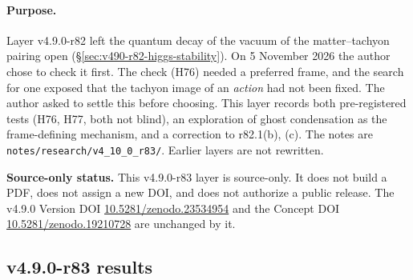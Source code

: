 \paragraph{Purpose.}
Layer v4.9.0-r82 left the quantum decay of the vacuum of the matter--tachyon pairing open
(\S\ref{sec:v490-r82-higgs-stability}).  On 5 November 2026 the author chose to check it first.  The check (H76) needed a preferred
frame, and the search for one exposed that the tachyon image of an \emph{action} had not been fixed.  The author asked to settle this
before choosing.  This layer records both pre-registered tests (H76, H77, both not blind), an exploration of ghost condensation as the
frame-defining mechanism, and a correction to r82.1(b), (c).  The notes are \texttt{notes/\allowbreak research/\allowbreak v4\_10\_0\_r83/}.
Earlier layers are not rewritten.

\noindent\textbf{Source-only status.}
This v4.9.0-r83 layer is source-only.  It does not build a PDF, does not assign a new DOI,
and does not authorize a public release.  The v4.9.0 Version DOI
\href{https://doi.org/10.5281/zenodo.23534954}{10.5281/zenodo.23534954} and the Concept DOI
\href{https://doi.org/10.5281/zenodo.19210728}{10.5281/zenodo.19210728} are unchanged by it.

\subsection*{v4.9.0-r83 results}
\label{subsec:v490-r83-results}

